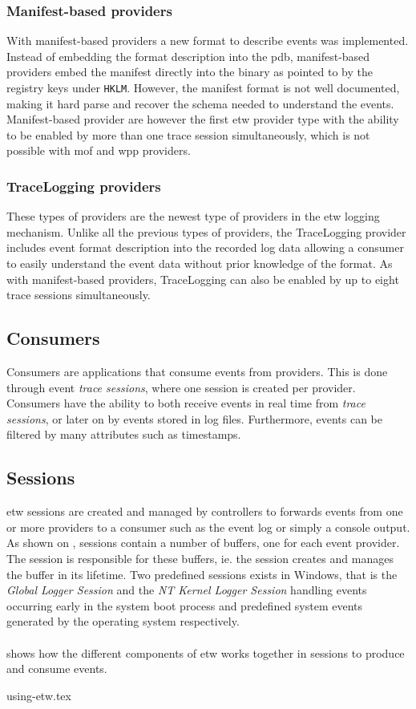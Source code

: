\documentclass{report}
\begin{document}
\subsubsection{Manifest-based providers}
\label{sec:etw:providers:manifest-based}
With manifest-based providers a new format to describe events was implemented. Instead of embedding the format description into the \gls{pdb}, manifest-based providers embed the manifest directly into the binary as pointed to by the registry keys under \texttt{HKLM\SOFTWARE\Microsoft\Windows\CurrentVersion\WINEVT\Publishers}. However, the manifest format is not well documented, making it hard parse and recover the schema needed to understand the events\cite{url:etw:various-information}. Manifest-based provider are however the first \gls{etw} provider type with the ability to be enabled by more than one trace session simultaneously, which is not possible with \gls{mof} and \gls{wpp} providers.

\subsubsection{TraceLogging providers}
These types of providers are the newest type of providers in the \gls{etw} logging mechanism. Unlike all the previous types of providers, the TraceLogging provider includes event format description into the recorded log data\cite{url:etw:provider-types} allowing a consumer to easily understand the event data without prior knowledge of the format. As with manifest-based providers, TraceLogging can also be enabled by up to eight trace sessions simultaneously.

\subsection{Consumers}
Consumers are applications that consume events from providers. This is done through event \emph{trace sessions}, where one session is created per provider. Consumers have the ability to both receive events in real time from \emph{trace sessions}, or later on by events stored in log files. Furthermore, events can be filtered by many attributes such as timestamps.

\subsection{Sessions}
\gls{etw} sessions are created and managed by controllers to forwards events from one or more providers to a consumer such as the event log or simply a console output. As shown on , sessions contain a number of buffers, one for each event provider. The session is responsible for these buffers, ie. the session creates and manages the buffer in its lifetime. Two predefined sessions exists in Windows, that is the \emph{Global Logger Session} and the \emph{NT Kernel Logger Session} handling events occurring early in the system boot process and predefined system events generated by the operating system respectively\cite{url:etw:trace:sessions}.
\\
\\
 shows how the different components of \gls{etw} works together in sessions to produce and consume events.

{using-etw.tex}
\end{document}
